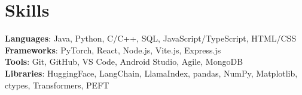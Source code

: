 \documentclass[letterpaper,11pt]{article}
\begin{document}
\section{Skills}
 \begin{itemize}[leftmargin=0.15in, label={}]
    \small{\item{
     \textbf{Languages}{: Java, Python, C/C++, SQL, JavaScript/TypeScript, HTML/CSS} \\
     \textbf{Frameworks}{: PyTorch, React, Node.js, Vite.js, Express.js} \\
     \textbf{Tools}{: Git, GitHub, VS Code, Android Studio, Agile, MongoDB} \\
     \textbf{Libraries}{: HuggingFace, LangChain, LlamaIndex, pandas, NumPy, Matplotlib, ctypes, Transformers, PEFT}
    }}
 \end{itemize}

\end{document}
